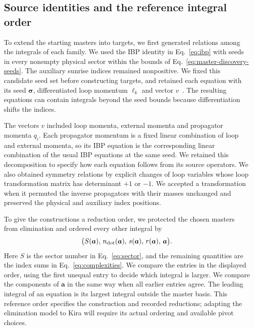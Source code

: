 \documentclass[11pt,a4paper]{article}
\begin{document}
\subsection{Source identities and the reference integral order}
To extend the starting masters into targets, we first generated
relations among the integrals of each family. We used the IBP identity
in Eq.~\eqref{eq:ibp} with seeds in every nonempty physical sector
within the bounds of Eq.~\eqref{eq:master-discovery-seeds}.
The auxiliary sunrise indices remained nonpositive. We fixed this
candidate seed set before constructing targets, and retained each
equation with its seed $\boldsymbol\sigma$, differentiated loop
momentum $\ell_k$ and vector $v$~\cite{ChetyrkinTkachov,KiraOriginal}.
The resulting equations can contain integrals beyond the seed bounds
because differentiation shifts the indices.

The vectors $v$ included loop momenta, external momenta and propagator
momenta $q_i$. Each propagator momentum is a fixed linear combination
of loop and external momenta, so its IBP equation is the corresponding
linear combination of the usual IBP equations at the same seed.
We retained this decomposition to specify how each equation follows
from its source operators. We also obtained symmetry relations by
explicit changes of loop variables whose loop transformation matrix
has determinant $+1$ or $-1$. We accepted a transformation when it
permuted the inverse propagators with their masses unchanged and
preserved the physical and auxiliary index positions.

To give the constructions a reduction order, we protected the chosen
masters from elimination and ordered every other integral by
\begin{equation}
 \bigl(S(\boldsymbol a),\,n_{\rm dot}(\boldsymbol a),\,
       s(\boldsymbol a),\,r(\boldsymbol a),\,\boldsymbol a\bigr).
 \label{eq:target-reference-order}
\end{equation}
Here $S$ is the sector number in Eq.~\eqref{eq:sector}, and the remaining
quantities are the index sums in Eq.~\eqref{eq:complexities}.
We compare the entries in the displayed order, using the first
unequal entry to decide which integral is larger. We compare the
components of $\boldsymbol a$ in the same way when all earlier entries
agree. The leading integral of an equation is its largest integral
outside the master basis. This reference order specifies the
construction and recorded reductions; adapting the elimination model
to Kira will require its actual ordering and available pivot choices.
\end{document}
